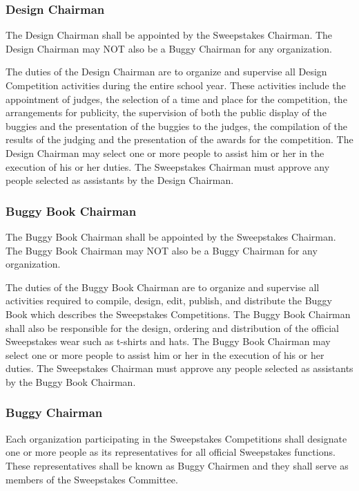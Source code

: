 \subsubsection{Design Chairman}

	The Design Chairman shall be appointed by the Sweepstakes Chairman. The Design
	Chairman may NOT also be a Buggy Chairman for any organization.

	The duties of the Design Chairman are to organize and supervise all Design
	Competition activities during the entire school year. These activities include
	the appointment of judges, the selection of a time and place for the
	competition, the arrangements for publicity, the supervision of both the public
	display of the buggies and the presentation of the buggies to the judges, the
	compilation of the results of the judging and the presentation of the awards
	for the competition. The Design Chairman may select one or more people to
	assist him or her in the execution of his or her duties. The Sweepstakes
	Chairman must approve any people selected as assistants by the Design Chairman.

\subsubsection{Buggy Book Chairman}

	The Buggy Book Chairman shall be appointed by the Sweepstakes Chairman. The
	Buggy Book Chairman may NOT also be a Buggy Chairman for any organization.

	The duties of the Buggy Book Chairman are to organize and supervise all
	activities required to compile, design, edit, publish, and distribute the Buggy
	Book which describes the Sweepstakes Competitions. The Buggy Book Chairman
	shall also be responsible for the design, ordering and distribution of the
	official Sweepstakes wear such as t-shirts and hats. The Buggy Book Chairman
	may select one or more people to assist him or her in the execution of his or
	her duties. The Sweepstakes Chairman must approve any people selected as
	assistants by the Buggy Book Chairman.

\subsubsection{Buggy Chairman}

	Each organization participating in the Sweepstakes Competitions shall designate
	one or more people as its representatives for all official Sweepstakes
	functions. These representatives shall be known as Buggy Chairmen and they
	shall serve as members of the Sweepstakes Committee.

